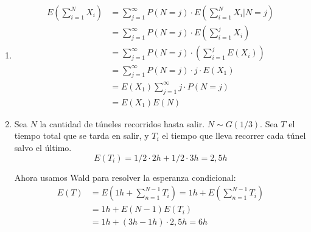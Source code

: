 \begin{enumerate}
	\item
		\begin{align*}
			E\left(\sum_{i=1}^{N}X_i\right)	& = \sum_{j=1}^{\infty} P(N=j) \cdot E\left(\sum_{i=1}^{N}X_i\Big|N=j\right)	\\
											& = \sum_{j=1}^{\infty} P(N=j) \cdot E\left(\sum_{i=1}^{j}X_i\right)			\\
											& = \sum_{j=1}^{\infty} P(N=j) \cdot \left(\sum_{i=1}^{j}E(X_i)\right)			\\
											& = \sum_{j=1}^{\infty} P(N=j) \cdot j\cdot E(X_1)			\\
											& = E(X_1) \sum_{j=1}^{\infty} j\cdot P(N=j)				\\
											& = E(X_1) E(N)
		\end{align*}
	\item
		Sea $N$ la cantidad de túneles recorridos hasta salir. $N\sim G(1/3)$.
		Sea $T$ el tiempo total que se tarda en salir, y $T_i$ el tiempo que lleva recorrer cada túnel salvo el último.
		$$E(T_i) = 1/2\cdot 2h + 1/2\cdot 3h = 2,5h$$
		
		Ahora usamos Wald para resolver la esperanza condicional:
		\begin{align*}
			E(T)	& = E\left(1h + \sum_{n=1}^{N-1}T_i\right) = 1h + E\left(\sum_{n=1}^{N-1}T_i\right)	\\
					& = 1h + E(N-1)E(T_i)	\\
					& = 1h + (3h-1h)\cdot 2,5h = 6h
		\end{align*}
\end{enumerate}
